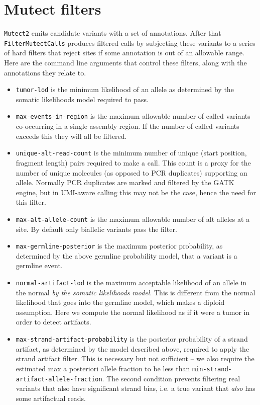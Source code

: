 \documentclass[nofootinbib,amssymb,amsmath]{revtex4}
\newcommand{\code}[1]{\texttt{#1}}
\begin{document}
\section{Mutect filters}
\code{Mutect2} emits candidate variants with a set of annotations.  After that \code{FilterMutectCalls} produces filtered calls by subjecting these variants to a series of hard filters that reject sites if some annotation is out of an allowable range.  Here are the command line arguments that control these filters, along with the annotations they relate to.

\begin{itemize}
\item  \code{tumor-lod} is the minimum likelihood of an allele as determined by the somatic likelihoods model required to pass.
\item \code{max-events-in-region} is the maximum allowable number of called variants co-occurring in a single assembly region.  If the number of called variants exceeds this they will all be filtered.
\item \code{unique-alt-read-count} is the minimum number of unique (start position, fragment length) pairs required to make a call.  This count is a proxy for the number of unique molecules (as opposed to PCR duplicates) supporting an allele.  Normally PCR duplicates are marked and filtered by the GATK engine, but in UMI-aware calling this may not be the case, hence the need for this filter.
\item \code{max-alt-allele-count} is the maximum allowable number of alt alleles at a site.  By default only biallelic variants pass the filter.
\item \code{max-germline-posterior} is the maximum posterior probability, as determined by the above germline probability model, that a variant is a germline event.
\item \code{normal-artifact-lod} is the maximum acceptable likelihood of an allele in the normal \textit{by the somatic likelihoods model}.  This is different from the normal likelihood that goes into the germline model, which makes a diploid assumption.  Here we compute the normal likelihood as if it were a tumor in order to detect artifacts.  
\item \code{max-strand-artifact-probability} is the posterior probability of a strand artifact, as determined by the model described above, required to apply the strand artifact filter.  This is necessary but not sufficient -- we also require the estimated max a posteriori allele fraction to be less than \code{min-strand-artifact-allele-fraction}.  The second condition prevents filtering real variants that also have significant strand bias, i.e. a true variant that \textit{also} has some artifactual reads.

\end{itemize}
\end{document}
